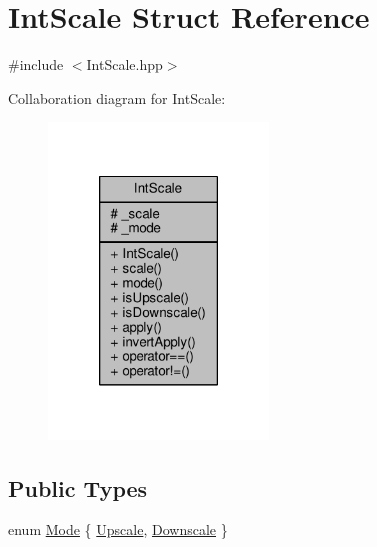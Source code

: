\hypertarget{struct_int_scale}{\section{Int\-Scale Struct Reference}
\label{struct_int_scale}
}


{\ttfamily \#include $<$Int\-Scale.\-hpp$>$}



Collaboration diagram for Int\-Scale\-:
\nopagebreak
\begin{figure}[H]
\begin{center}
\leavevmode
\includegraphics[width=166pt]{struct_int_scale__coll__graph}
\end{center}
\end{figure}
\subsection*{Public Types}
\begin{DoxyCompactItemize}
\item 
enum \hyperlink{struct_int_scale_ab7d4e812b60cd562ddc4fb120ff1f0cc}{Mode} \{ \hyperlink{struct_int_scale_ab7d4e812b60cd562ddc4fb120ff1f0cca2438a8014fcf179200678d989f41d3ac}{Upscale}, 
\hyperlink{struct_int_scale_ab7d4e812b60cd562ddc4fb120ff1f0ccabc4c88fd06b273007bdb99fb0d7900d1}{Downscale}
 \}
\end{DoxyCompactItemize}
